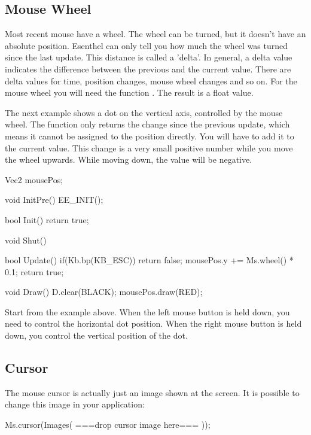 \subsection{Mouse Wheel}
Most recent mouse have a wheel. The wheel can be turned, but it doesn't have an absolute position. Esenthel can only tell you how much the wheel was turned since the last update. This distance is called a 'delta'. In general, a delta value indicates the difference between the previous and the current value. There are delta values for time, position changes, mouse wheel changes and so on. For the mouse wheel you will need the function . The result is a float value.

The next example shows a dot on the vertical axis, controlled by the mouse wheel. The function  only returns the change since the previous update, which means it cannot be assigned to the position directly. You will have to add it to the current value. This change is a very small positive number while you move the wheel upwards. While moving down, the value will be negative.

\begin{code}
Vec2 mousePos;

void InitPre()
{
   EE_INIT();
}

bool Init()
{   
   return true;
}

void Shut() {}

bool Update()
{
   if(Kb.bp(KB_ESC)) return false;  
   mousePos.y += Ms.wheel() * 0.1;  
   return true;
}

void Draw()
{
   D.clear(BLACK);
   mousePos.draw(RED);
}
\end{code}

\begin{exercise}
Start from the example above. When the left mouse button is held down, you need to control the horizontal dot position. When the right mouse button is held down, you control the vertical position of the dot.
\end{exercise} 


\subsection{Cursor}
The mouse cursor is actually just an image shown at the screen. It is possible to change this image in your application:

\begin{code}
Ms.cursor(Images( ===drop cursor image here=== ));
\end{code}

